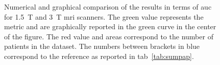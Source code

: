 \begin{figure}
{
 }
  \caption[Results comparison from the state-of-the-art in terms of \acs*{auc}.]{Numerical and graphical comparison of the results in terms of \acs*{auc} for \SI{1.5}{\tesla} and \SI{3}{\tesla} \acs*{mri} scanners. The {\color{semiAuto}green} value represents the metric and are graphically reported in the {\color{semiAuto}green} curve in the center of the figure. The {\color{red}red} value and areas correspond to the number of patients in the dataset. The numbers between brackets in {blue\color{blue}} correspond to the reference as reported in \acs{tab}~\ref{tab:sumpap}.}
  \label{fig:auc}
\end{figure}

